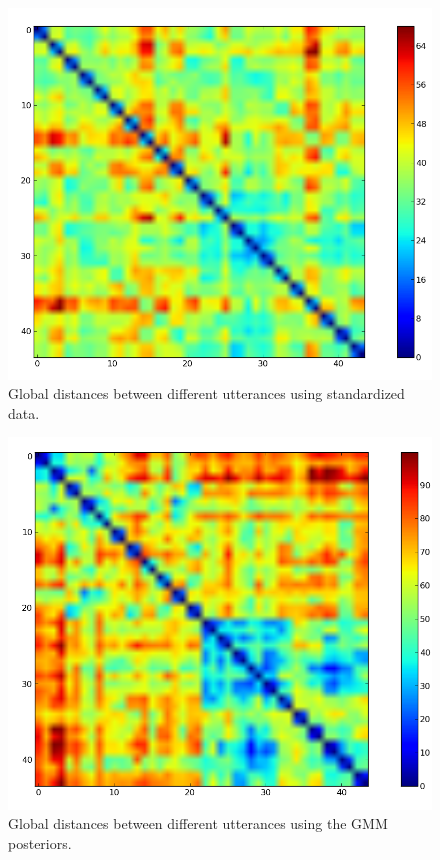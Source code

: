 \documentclass[12pt,a4paper,oneside]{article}
\begin{document}
\begin{figure}
\centering
\includegraphics[scale=0.45]{../D_std.png}
\caption{Global distances between different utterances using standardized data.}
\label{fig:glob_std}
\end{figure}

\begin{figure}
\centering
\includegraphics[scale=0.45]{../D_probs.png}
\caption{Global distances between different utterances using the GMM posteriors.}
\label{fig:glob_probs}
\end{figure}
\end{document}
